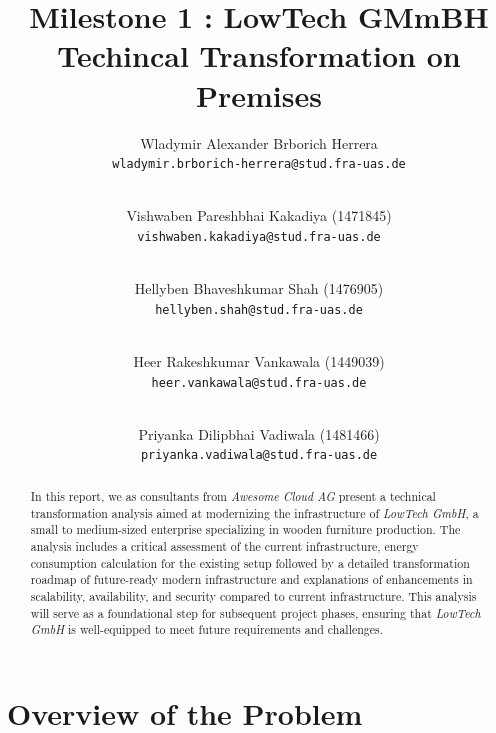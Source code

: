\documentclass{llncs}
\newcommand{\what}{Milestone 1 : LowTech GMmBH Techincal Transformation on Premises}
\begin{document}
%
%
%
\mainmatter              %
%
\title{\what}
%
\author{
  Wladymir Alexander Brborich Herrera\\
  \texttt{wladymir.brborich-herrera@stud.fra-uas.de}
  \and\\ 
  Vishwaben Pareshbhai Kakadiya (1471845)\\
  \texttt{vishwaben.kakadiya@stud.fra-uas.de}
  \and\\
  Hellyben Bhaveshkumar Shah (1476905)\\
  \texttt{hellyben.shah@stud.fra-uas.de}
  \and\\
  Heer Rakeshkumar Vankawala (1449039)
  \\
  \texttt{heer.vankawala@stud.fra-uas.de}
  \and\\
  Priyanka Dilipbhai Vadiwala (1481466)\\
  \texttt{priyanka.vadiwala@stud.fra-uas.de}
}
%

\maketitle              %

\begin{abstract}
  In this report, we as consultants from \textit{Awesome Cloud AG} present a technical transformation analysis aimed at modernizing the infrastructure of \textit{LowTech GmbH}, 
  a small to medium-sized enterprise specializing in wooden furniture production. 
  The analysis includes a critical assessment of the current infrastructure, energy consumption calculation for the existing setup 
  followed by a detailed transformation roadmap of future-ready modern infrastructure and explanations of enhancements in scalability, availability, and security compared to current infrastructure. 
  This analysis will serve as a foundational step for subsequent project phases, ensuring that \textit{LowTech GmbH} is well-equipped to meet future requirements and challenges.
\end{abstract}

\section{Overview of the Problem}
\end{document}
